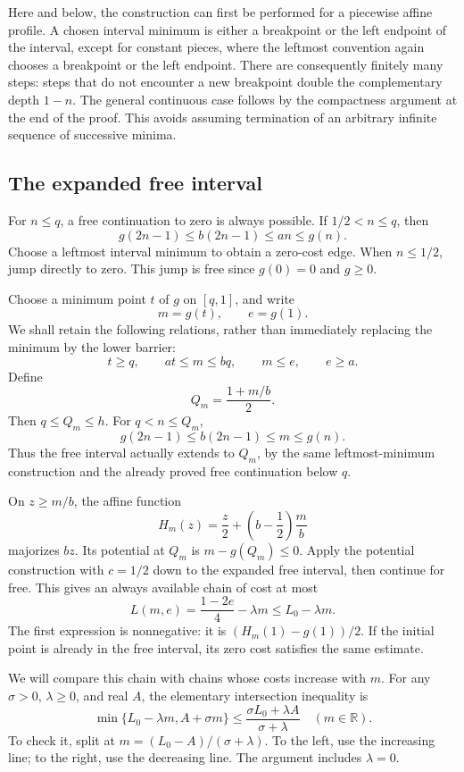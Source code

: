 Here and below, the construction can first be performed for a piecewise
affine profile. A chosen interval minimum is either a breakpoint or the
left endpoint of the interval, except for constant pieces, where the
leftmost convention again chooses a breakpoint or the left endpoint.
There are consequently finitely many steps: steps that do not encounter
a new breakpoint double the complementary depth \(1-n\). The general
continuous case follows by the compactness argument at the end of the
proof. This avoids assuming termination of an arbitrary infinite sequence
of successive minima.

\subsection{The expanded free interval}
For \(n\le q\), a free continuation to zero is always possible. If
\(1/2<n\le q\), then
\[
 g(2n-1)\le b(2n-1)\le an\le g(n).
\]
Choose a leftmost interval minimum to obtain a zero-cost edge. When
\(n\le1/2\), jump directly to zero. This jump is free since
\(g(0)=0\) and \(g\ge0\).

Choose a minimum point \(t\) of \(g\) on \([q,1]\), and write
\[
 m=g(t),\qquad e=g(1).
\]
We shall retain the following relations, rather than immediately replacing
the minimum by the lower barrier:
\begin{equation}\label{minimum:actual-relations}
 t\ge q,\qquad at\le m\le bq,\qquad m\le e,\qquad e\ge a.
\end{equation}
Define
\[
 Q_m=\frac{1+m/b}{2}.
\]
Then \(q\le Q_m\le h\). For \(q<n\le Q_m\),
\[
 g(2n-1)\le b(2n-1)\le m\le g(n).
\]
Thus the free interval actually extends to \(Q_m\), by the same
leftmost-minimum construction and the already proved free continuation
below \(q\).

On \(z\ge m/b\), the affine function
\[
 H_m(z)=\frac z2+\left(b-\frac12\right)\frac mb
\]
majorizes \(bz\). Its potential at \(Q_m\) is
\(m-g(Q_m)\le0\). Apply the potential construction with \(c=1/2\)
down to the expanded free interval, then continue for free. This gives
an always available chain of cost at most
\begin{equation}\label{minimum:floor}
 L(m,e)=\frac{1-2e}{4}-\lambda m
 \le L_0-\lambda m.
\end{equation}
The first expression is nonnegative: it is
\((H_m(1)-g(1))/2\). If the initial point is already in the free
interval, its zero cost satisfies the same estimate.

We will compare this chain with chains whose costs increase with \(m\).
For any \(\sigma>0\), \(\lambda\ge0\), and real \(A\), the elementary
intersection inequality is
\begin{equation}\label{minimum:intersection}
 \min\{L_0-\lambda m,A+\sigma m\}
 \le\frac{\sigma L_0+\lambda A}{\sigma+\lambda}
 \quad(m\in\mathbb R).
\end{equation}
To check it, split at \(m=(L_0-A)/(\sigma+\lambda)\). To the left,
use the increasing line; to the right, use the decreasing line. The
argument includes \(\lambda=0\).

